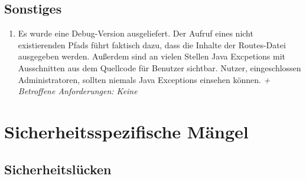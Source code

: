 \documentclass[12pt,DIV14,BCOR10mm,a4paper,parskip=half-,headsepline,headinclude,english,ngerman,bibliography=totocnumbered]{scrreprt}
\begin{document}
\section{Sonstiges}

\begin{enumerate}[resume]


 

  \item Es wurde eine Debug-Version ausgeliefert. Der Aufruf eines nicht existierenden Pfads führt faktisch dazu, dass die Inhalte der Routes-Datei ausgegeben werden. Außerdem sind an vielen Stellen Java Excpetions mit Ausschnitten aus dem Quellcode für Benutzer sichtbar. Nutzer, eingeschlossen Administratoren, sollten niemals Java Exceptions einsehen können.\newline
  \textit{+ Betroffene Anforderungen: Keine} 
 
  
\end{enumerate}

\chapter{Sicherheitsspezifische Mängel}

\section{Sicherheitslücken}
\end{document}
